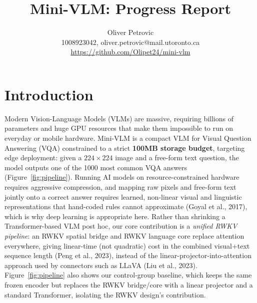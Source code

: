 \documentclass[final]{article}
\title{Mini-VLM: Progress Report}
\author{%
  Oliver Petrovic \\
  1008923042, oliver.petrovic@mail.utoronto.ca\\
  \url{https://github.com/Olipet24/mini-vlm}\\
}
\begin{document}
\maketitle

\vspace{-0.5in}

\section*{Introduction}

Modern Vision-Language Models (VLMs) are massive, requiring billions of parameters and huge GPU
resources that make them impossible to run on everyday or mobile hardware. Mini-VLM is a compact
VLM for Visual Question Answering (VQA) constrained to a strict \textbf{100MB storage budget},
targeting edge deployment: given a $224\times224$ image and a free-form text question, the model
outputs one of the 1000 most common VQA answers (Figure~\ref{fig:pipeline}). Running AI models on
resource-constrained hardware requires aggressive compression, and mapping raw pixels and
free-form text jointly onto a correct answer requires learned, non-linear visual and linguistic
representations that hand-coded rules cannot approximate (Goyal et al., 2017), which is why deep
learning is appropriate here. Rather than shrinking a Transformer-based VLM post hoc, our core
contribution is a \emph{unified RWKV pipeline}: an RWKV spatial bridge and RWKV language core
replace attention everywhere, giving linear-time (not quadratic) cost in the combined visual+text
sequence length (Peng et al., 2023), instead of the linear-projector-into-attention approach used
by connectors such as LLaVA (Liu et al., 2023). Figure~\ref{fig:pipeline} also shows our
control-group baseline, which keeps the same frozen encoder but replaces the RWKV bridge/core
with a linear projector and a standard Transformer, isolating the RWKV design's contribution.
\end{document}
